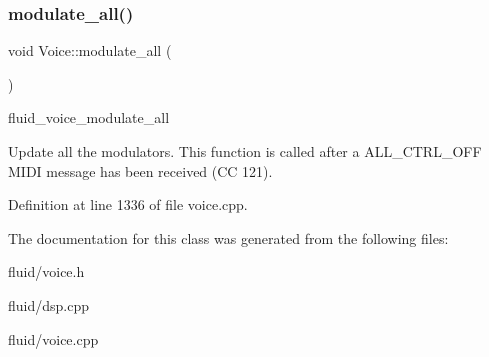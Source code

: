 \subsubsection{\texorpdfstring{modulate\+\_\+all()}{modulate\_all()}}
{\footnotesize\ttfamily void Voice\+::modulate\+\_\+all (\begin{DoxyParamCaption}{ }\end{DoxyParamCaption})}

fluid\+\_\+voice\+\_\+modulate\+\_\+all

Update all the modulators. This function is called after a A\+L\+L\+\_\+\+C\+T\+R\+L\+\_\+\+O\+FF M\+I\+DI message has been received (CC 121). 

Definition at line 1336 of file voice.\+cpp.



The documentation for this class was generated from the following files\+:\begin{DoxyCompactItemize}
\item 
fluid/voice.\+h\item 
fluid/dsp.\+cpp\item 
fluid/voice.\+cpp\end{DoxyCompactItemize}
